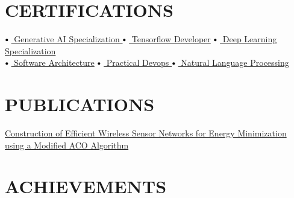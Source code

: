 \documentclass[letterpaper,11pt]{article}
\newcommand\sbullet[1][.5]{\mathbin{\vcenter{\hbox{\scalebox{#1}{$\bullet$}}}}}
\begin{document}
 
\section{CERTIFICATIONS}

$\sbullet[.75] \hspace{0.1cm}${\href{https://www.coursera.org/account/accomplishments/specialization/certificate/HTW6T9JV6TWB}{ Generative AI Specialization }} \hspace{1cm}
$\sbullet[.75] \hspace{0.1cm}${\href{https://www.coursera.org/account/accomplishments/specialization/certificate/VM84M4KYXB6Y}{ Tensorflow Developer}} \hspace{1.1cm}
$\sbullet[.75] \hspace{0.1cm}${\href{https://www.coursera.org/account/accomplishments/specialization/certificate/8C3LD42HQ2J6}{ Deep Learning Specialization}} \\
$\sbullet[.75] \hspace{0.1cm}${\href{https://www.udemy.com/certificate/UC-84855734-1563-4924-ae9a-8da1be5e8bdb/}{ Software Architecture}} \hspace{2.3cm}
$\sbullet[.75] \hspace{0.1cm}${\href{https://www.udemy.com/certificate/UC-a39907b6-261c-44ec-aa44-9a58cbefebd9/}{ Practical Devops }} \hspace{1.7cm}
$\sbullet[.75] \hspace{0.1cm}${\href{https://www.coursera.org/account/accomplishments/specialization/certificate/SHTEESHQQ8WR}{ Natural Language Processing}} \\


\section{PUBLICATIONS}
\noindent
\href{https://doi.org/10.2174/2210327911666210120122610}{Construction of Efficient Wireless Sensor Networks for Energy Minimization using a Modified ACO Algorithm} 


\section{ACHIEVEMENTS}
\noindent
\end{document}

